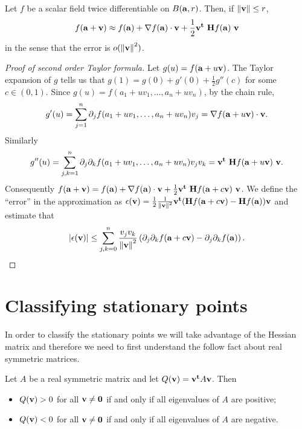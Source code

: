 \begin{theorem}
    Let \(f\) be a scalar field twice differentiable on \(B(\aa,r)\).
    Then, if \(\norm{\vv}\leq r\),
    \[
        f(\aa+\vv) \approx f(\aa) + \nabla f(\aa) \cdot \vv + \frac{1}{2} \vv^{\mathbf{t}} \ \mathbf{H} f (\aa) \ \vv
    \]
    in the sense that the error is \(\littleo{\norm{\vv}^2}\).
\end{theorem}




\begin{proof}[Proof of second order Taylor formula]
    Let \(g(u) = f(\aa + u \vv)\).
    The Taylor expansion of \(g\) tells us that
    \(g(1) = g(0) + g'(0) + \frac{1}{2} g''(c)\) for some \(c\in (0,1)\).
    Since \(g(u) = f(a_1 + uv_1, \ldots, a_n + u v_n)\), by the chain rule,
    \[
        g'(u) = \sum_{j=1}^{n} \partial_j f( a_1 + uv_1, \ldots, a_n + u v_n ) v_j
        =\nabla f( \aa + u \vv) \cdot \vv.
    \]
    Similarly
    \[
        g''(u) = \sum_{j,k=1}^{n} \partial_j\partial_k f( a_1 + uv_1, \ldots, a_n + u v_n ) v_j v_k
        =  \vv^{\mathbf{t}} \ \mathbf{H} f (\aa + u \vv) \ \vv.
    \]
    Consequently
    \(
    f(\aa+\vv) = f(\aa) + \nabla f(\aa) \cdot \vv + \frac{1}{2} \vv^{\mathbf{t}} \ \mathbf{H} f (\aa + c\vv) \ \vv
    \).
    We define the ``error'' in the approximation as \(\epsilon(\vv) = \frac{1}{2} \frac{1}{\norm{\vv}^2} \vv^{\mathbf{t}} (\mathbf{H} f (\aa + c\vv) - \mathbf{H} f (\aa)  ) \vv\)
    and estimate that
    \[
        \abs{\epsilon(\vv)} \leq \sum_{j,k=0}^{n}
        \frac{v_j v_k}{\norm{\vv}^2} \left( \partial_{j}\partial_{k}f(\aa+c\vv)-\partial_{j}\partial_{k}f(\aa) \right).
    \]
\end{proof}


\section{Classifying stationary points}

In order to classify the stationary points we will take advantage of the Hessian matrix and therefore we need to first understand the follow fact about real symmetric matrices.

\begin{theorem}
    Let \(A\) be a real symmetric matrix and let
    \(Q(\vv) =  \vv^{\mathbf{t}} A  \vv  \).
    Then
    \begin{itemize}
        \item \(Q(\vv) > 0\) for all \(\vv \neq \mathbf{0}\) if and only if all eigenvalues of \(A\) are positive;
        \item \(Q(\vv) < 0\) for all \(\vv \neq \mathbf{0}\) if and only if all eigenvalues of \(A\) are negative.
    \end{itemize}
\end{theorem}

